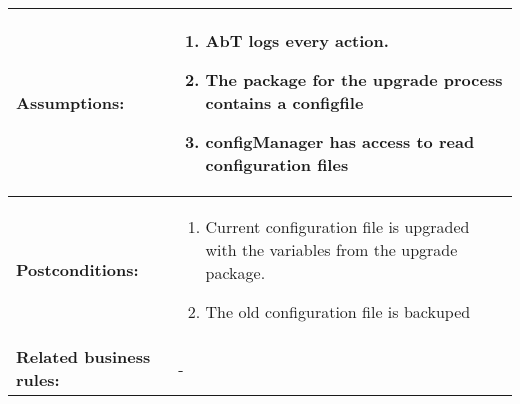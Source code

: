 \newpage
\begin{tabularx}{\linewidth}{|l|X|}
\hline
\textbf{Assumptions:} & \begin{enumerate} 
							\item AbT logs every action.
							\item The package for the upgrade process contains a configfile
							\item configManager has access to read configuration files
						\end{enumerate} \\
\hline
\textbf{Postconditions:} & 
  \begin{minipage}{\linewidth}
  \vspace{0.05em}
  \begin{enumerate}
    \item Current configuration file is upgraded with the variables from the upgrade package.
	\item The old configuration file is backuped
  \end{enumerate}
  \vspace{0.05em}
\end{minipage}
\\
\hline
\textbf{Related business rules:} & - \\
\hline
\end{tabularx}


